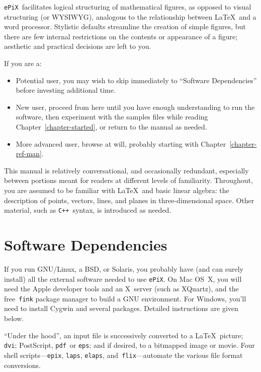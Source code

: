 \documentclass[12pt,letterpaper]{book}
\newcommand{\code}[1]{\texttt{#1}}
\newcommand{\ePiX}{\code{ePiX}}
\newcommand{\epix}{\code{epix}}
\newcommand{\CXX}{\code{C++}}
\begin{document}
\ePiX\ facilitates logical structuring of mathematical figures, as
opposed to visual structuring (or WYSIWYG), analogous to the
relationship between \LaTeX\ and a word processor. Stylistic
defaults streamline the creation of simple figures, but there are few
internal restrictions on the contents or appearance of a figure;
aesthetic and practical decisions are left to you.

If you are a:

\begin{itemize}

\item Potential user, you may wish to skip immediately to ``Software
  Dependencies'' before investing additional time.

\item New user, proceed from here until you have enough understanding
  to run the software, then experiment with the samples files while
  reading Chapter~\ref{chapter-started}, or return to the manual as
  needed.

\item More advanced user, browse at will, probably starting with
  Chapter~\ref{chapter-ref-man}.

\end{itemize}

This manual is relatively conversational, and occasionally redundant,
especially between portions meant for readers at different levels of
familiarity. Throughout, you are assumed to be familiar with \LaTeX\
and basic linear algebra: the description of points, vectors, lines,
and planes in three-dimensional space. Other material, such as \CXX\
syntax, is introduced as needed.


\section{Software Dependencies}
\label{section-software_deps}


If you run GNU/Linux, a BSD, or Solaris, you probably have (and can
surely install) all the external software needed to use \ePiX.  On Mac
OS~X, you will need the Apple developer tools and an X~server (such as
XQuartz), and the free~\code{fink} package manager to build a GNU
environment.  For Windows, you'll need to install Cygwin and several
packages. Detailed instructions are given below.

``Under the hood'', an input file is successively converted to a
\LaTeX\ picture; \code{dvi}; PostScript, \code{pdf}~or \code{eps}; and
if desired, to a bitmapped image or movie.  Four shell
scripts---\epix, \code{laps}, \code{elaps}, and~\code{flix}---automate
the various file format conversions.
\end{document}

